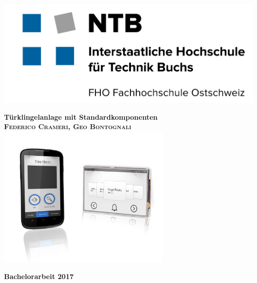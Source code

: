 \begin{titlepage}


	\begin{flushleft}
		\includegraphics[scale=0.1]{image/ntb.jpg}
	\end{flushleft}
	
    \begin{center}
	    \vspace{0.5cm}
	    \Huge \textbf{\textsf{Türklingelanlage mit Standardkomponenten}} \\
		\vspace{0.5cm}
		\large\textbf{\textsc{Federico Crameri, Geo Bontognali}}\\
		
		\vspace{0.5cm}
	    \includegraphics[height=7cm]{image/Titleimage.png}
	
	    \normalsize
	    \vspace{1cm}
	    \large \textbf{Bachelorarbeit 2017}\\
	    \vspace{1cm}
	

\end{center}
\end{titlepage}
